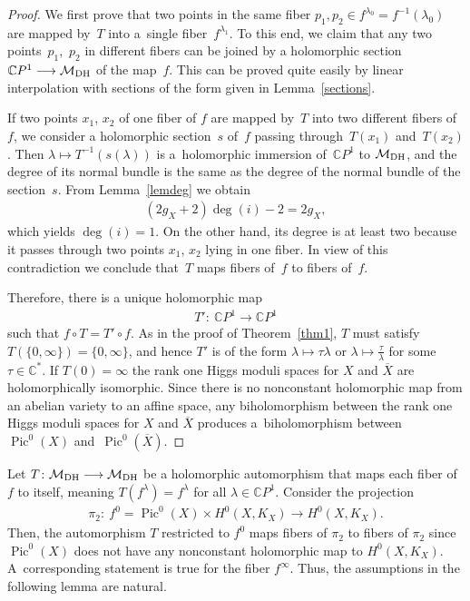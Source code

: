 \begin{proof} We f\/irst prove that two points in the same f\/iber $p_1, p_2 \in f^{\lambda_0} = f^{-1}(\lambda_0)$ are mapped by~$T$ into a~single f\/iber~$f^{\lambda_1}$. To this end, we claim that any two points~$p_1$,~$p_2$ in dif\/ferent f\/ibers can be joined by a holomorphic section ${\mathbb C}P^1 \longrightarrow {\mathcal M}_{\rm DH}$ of the map~$f$. This can be proved quite easily by linear interpolation with sections of the form given in Lemma~\ref{sections}.

If two points $x_1$, $x_2$ of one f\/iber of $f$ are mapped by~$T$ into two dif\/ferent f\/ibers of $f$, we consider a holomorphic section~$s$ of~$f$ passing through~$T(x_1)$ and~$T(x_2)$. Then $\lambda \longmapsto T^{-1}(s(\lambda))$ is a~holomorphic immersion of~${\mathbb C}P^1$ to ${\mathcal M}_{\rm DH}$, and the degree of its normal bundle is the same as the degree of the normal bundle of the section~$s$. From Lemma~\ref{lemdeg} we obtain
\begin{gather*}(2 g_X+2)\deg (i)-2=2g_X,\end{gather*}
which yields $\deg (i)=1$. On the other hand, its degree is at least two because it passes through two points $x_1$, $x_2$ lying in one f\/iber. In view of this contradiction we conclude that~$T$ maps f\/ibers of~$f$ to f\/ibers of~$f$.

Therefore, there is a unique holomorphic map
\begin{gather*}T'\colon \ {\mathbb C}P^1 \longrightarrow {\mathbb C}P^1\end{gather*}
such that $f\circ T = T'\circ f$. As in the proof of Theorem~\ref{thm1}, $T$ must satisfy $T(\{0,\infty\}) = \{0,\infty\}$, and hence $T'$ is of the form $\lambda \longmapsto \tau\lambda$ or $\lambda \longmapsto \frac{\tau}{\lambda}$ for some $\tau \in \mathbb C^*$. If $T(0) = \infty$ the rank one Higgs moduli spaces for $X$ and $\overline X$ are holomorphically isomorphic. Since there is no nonconstant holomorphic map from an abelian variety
to an af\/f\/ine space, any biholomorphism between the rank one Higgs moduli spaces for $X$ and $\overline X$ produces a~biholomorphism between~$\operatorname{Pic}^0(X)$ and~$\operatorname{Pic}^0(\overline{X})$.
\end{proof}

Let $T \colon {\mathcal M}_{\rm DH} \longrightarrow {\mathcal M}_{\rm DH}$ be a holomorphic automorphism that maps each f\/iber of $f$ to itself, meaning $T(f^\lambda) = f^\lambda$ for all $\lambda \in {\mathbb C}P^1$. Consider the projection
\begin{gather}\label{pi2}
\pi_2 \colon \ f^0  = \operatorname{Pic}^0(X)\times H^0(X, K_X) \longrightarrow H^0(X, K_X) .
\end{gather}
Then, the automorphism $T$ restricted to $f^0$ maps f\/ibers of $\pi_2$ to f\/ibers of $\pi_2$ since $\operatorname{Pic}^0(X)$ does not have any nonconstant holomorphic map to $H^0(X, K_X)$. A~corresponding statement is true for the f\/iber $f^\infty$. Thus, the assumptions in the following
lemma are natural.

